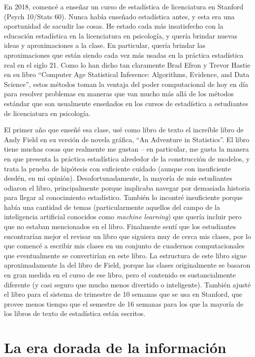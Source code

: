 \documentclass[
  12pt,
]{book}
\begin{document}
En 2018, comencé a enseñar un curso de estadística de licenciatura en Stanford (Psych 10/Stats 60). Nunca había enseñado estadística antes, y esta era una oportunidad de sacudir las cosas. He estado cada más insatisfecho con la educación estadística en la licenciatura en psicología, y quería brindar nuevas ideas y aproximaciones a la clase. En particular, quería brindar las aproximaciones que están siendo cada vez más usadas en la práctica estadística real en el siglo 21. Como lo han dicho tan claramente Brad Efron y Trevor Hastie en su libro ``Computer Age Statistical Inference: Algorithms, Evidence, and Data Science'', estos métodos toman la ventaja del poder computacional de hoy en día para resolver problemas en maneras que van mucho más allá de los métodos estándar que son usualmente enseñados en los cursos de estadística a estudiantes de licenciatura en psicología.

El primer año que enseñé esa clase, usé como libro de texto el increíble libro de Andy Field en su versión de novela gráfica, ``An Adventure in Statistics''. El libro tiene muchas cosas que realmente me gustan -- en particular, me gusta la manera en que presenta la práctica estadística alrededor de la construcción de modelos, y trata la prueba de hipótesis con suficiente cuidado (aunque con insuficiente desdén, en mi opinión). Desafortunadamente, la mayoría de mis estudiantes odiaron el libro, principalmente porque implicaba navegar por demasiada historia para llegar al conocimiento estadístico. También lo incontré insuficiente porque había una cantidad de temas (particularmente aquellos del campo de la inteligencia artificial conocidos como \emph{machine learning}) que quería incluir pero que no estaban mencionados en el libro. Finalmente sentí que los estudiantes encontrarían mejor el revisar un libro que siguiera muy de cerca mis clases, por lo que comencé a escribir mis clases en un conjunto de cuadernos computacionales que eventualmente se convertirían en este libro. La estructura de este libro sigue aproximadamente la del libro de Field, porque las clases originalmente se basaron en gran medida en el curso de ese libro, pero el contenido es sustancialmente diferente (y casi seguro que mucho menos divertido o inteligente). También ajusté el libro para el sistema de trimestre de 10 semanas que se usa en Stanford, que provee menos tiempo que el semestre de 16 semanas para los que la mayoría de los libros de texto de estadística están escritos.

\hypertarget{la-era-dorada-de-la-informaciuxf3n}{%
\section{La era dorada de la información}\label{la-era-dorada-de-la-informaciuxf3n}}
\end{document}

